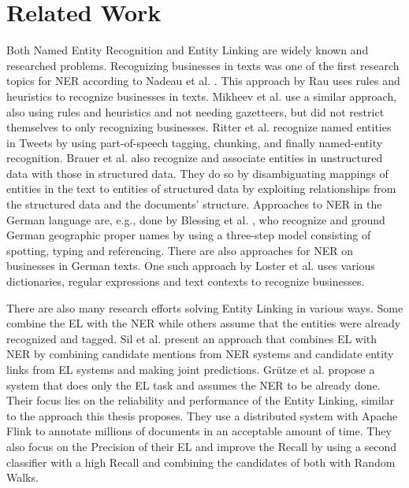 \section{Related Work}
\label{sec:RelatedWork}
Both Named Entity Recognition and Entity Linking are widely known and researched problems. Recognizing businesses in texts was one of the first research topics for NER according to Nadeau et al. \cite{ner-sekine2007}. This approach by Rau \cite{rau91} uses rules and heuristics to recognize businesses in texts. Mikheev et al. \cite{Mikheev:1999:NER:977035.977037} use a similar approach, also using rules and heuristics and not needing gazetteers, but did not restrict themselves to only recognizing businesses. Ritter et al. \cite{Ritter:2011:NER:2145432.2145595} recognize named entities in Tweets by using part-of-speech tagging, chunking, and finally named-entity recognition. Brauer et al. \cite{Brauer:2008:MEE:1458550.1458566} also recognize and associate entities in unstructured data with those in structured data. They do so by disambiguating mappings of entities in the text to entities of structured data by exploiting relationships from the structured data and the documents' structure. Approaches to NER in the German language are, e.g., done by Blessing et al. \cite{Blessing:2007:TCM:1316948.1316956}, who recognize and ground German geographic proper names by using a three-step model consisting of spotting, typing and referencing. There are also approaches for NER on businesses in German texts. One such approach by Loster et al. \cite{Michael2017a} uses various dictionaries, regular expressions and text contexts to recognize businesses.\par
There are also many research efforts solving Entity Linking in various ways. Some combine the EL with the NER while others assume that the entities were already recognized and tagged. Sil et al. \cite{Sil:2013:RJN:2505515.2505601} present an approach that combines EL with NER by combining candidate mentions from NER systems and candidate entity links from EL systems and making joint predictions. Grütze et al. \cite{coheel} propose a system that does only the EL task and assumes the NER to be already done. Their focus lies on the reliability and performance of the Entity Linking, similar to the approach this thesis proposes. They use a distributed system with Apache Flink to annotate millions of documents in an acceptable amount of time. They also focus on the Precision of their EL and improve the Recall by using a second classifier with a high Recall and combining the candidates of both with Random Walks.

